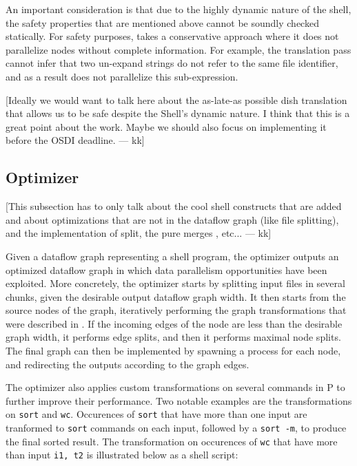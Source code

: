\documentclass[letterpaper,twocolumn,10pt]{article}
\newcommand{\ttt}[1]{\texttt{\small #1}}
\newcommand{\cn}[1]{\mbox{\textcircled{\footnotesize #1}}}
\newcommand{\pur}{\cn{\textsc{P}}\xspace}
\newcommand{\nv}[1]{[{\color{cyan}#1 --- nv}]}
\newcommand{\kk}[1]{[{\color{magenta}#1 --- kk}]}
\begin{document}
An important consideration is that due to the highly dynamic nature of
the shell, the safety properties that are mentioned above cannot be
soundly checked statically.  For safety purposes, \sys takes a
conservative approach where it does not parallelize nodes without
complete information.  For example, the translation pass cannot infer
that two un-expand strings do not refer to the same file identifier,
and as a result does not parallelize this sub-expression.

\kk{Ideally we would want to talk here about the as-late-as possible
  dish translation that allows us to be safe despite the Shell's
  dynamic nature. I think that this is a great point about the
  work. Maybe we should also focus on implementing it before the OSDI
  deadline.}

\subsection{Optimizer}
\label{optimizer}

\kk{This subsection has to only talk about the cool shell constructs
  that are added and about optimizations that are not in the dataflow
  graph (like file splitting), and the implementation of split, the
  pure merges , etc...}

Given a dataflow graph representing a shell program, the \sys optimizer outputs an optimized dataflow graph in which data parallelism opportunities have been exploited.
More concretely, the
optimizer starts by splitting input files in several chunks, given the
desirable output dataflow graph width. It then starts from the source
nodes of the graph, iteratively performing the graph transformations
that were described in . If the incoming
edges of the node are less than the desirable graph width, it performs
edge splits, and then it performs maximal node splits. The final graph
can then be implemented by spawning a process for each node, and
redirecting the outputs according to the graph edges.

The optimizer also applies custom transformations on several commands in \pur
to further improve their performance. Two notable examples are the
transformations on \ttt{sort} and \ttt{wc}. Occurences of \ttt{sort}
that have more than one input are tranformed to \ttt{sort} commands on
each input, followed by a \ttt{sort -m}, to produce the final sorted
result. The transformation on occurences of \ttt{wc} that have more
than input \ttt{i1, t2} is illustrated below as a shell script:
\end{document}
